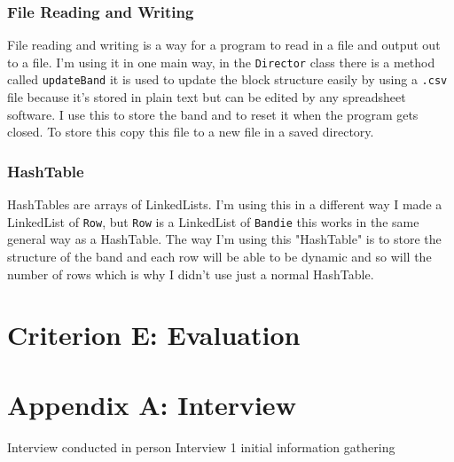 \documentclass{article}
\begin{document}
\subsubsection{File Reading and Writing}
File reading and writing is a way for a program to read in a file and output out to a file. I'm using it in one main way, in the \verb|Director| class there is a method called \verb|updateBand| it is used to update the block structure easily by using a \verb|.csv| file because it's stored in plain text but can be edited by any spreadsheet software. I use this to store the band and to reset it when the program gets closed. To store this copy this file to a new file in a saved directory\cite{moveFileStackoverflow}.
\subsubsection{HashTable}
HashTables\cite{hashTable} are arrays of LinkedLists\cite{linkedList}. I'm using this in a different way I made a LinkedList\cite{linkedList} of \verb|Row|, but \verb|Row| is a LinkedList\cite{linkedList} of \verb|Bandie| this works in the same general way as a HashTable\cite{hashTable}. The way I'm using this "HashTable" is to store the structure of the band and each row will be able to be dynamic and so will the number of rows which is why I didn't use just a normal HashTable\cite{hashTable}.
\newpage
\section{Criterion E: Evaluation}
\newpage
\section{Appendix A: Interview}
Interview conducted in person
Interview 1 initial information gathering
\end{document}
